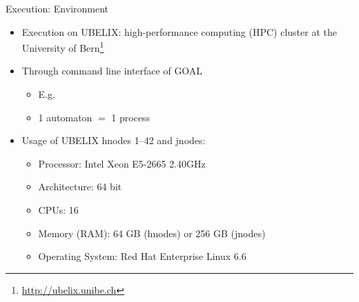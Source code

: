 \documentclass[12pt]{beamer}
\begin{document}
\begin{frame}{Execution: Environment}
\vspace{3mm}
\begin{itemize}\itemsep9pt
\item Execution on UBELIX: high-performance computing (HPC) cluster at the University of Bern\footnote{\url{http://ubelix.unibe.ch}}
\pause
\item Through command line interface of GOAL
  \begin{itemize}\itemsep1pt
  \item E.g. \texttt{\color{blue}{gc complement -m fribourg 00001.gff}}
  \item 1 automaton $=$ 1 process
  \end{itemize}
\pause
\item Usage of UBELIX hnodes 1--42 and jnodes:
  \begin{itemize}\itemsep1pt
  \item Processor:        \tabto{3.25cm} Intel Xeon E5-2665 2.40GHz
  \item Architecture:     \tabto{3.25cm} 64 bit
  \item CPUs:             \tabto{3.25cm} 16
  \item Memory (RAM):     \tabto{3.25cm} 64 GB (hnodes) or 256 GB (jnodes)
  \item Operating System: \tabto{3.25cm} Red Hat Enterprise Linux 6.6
  \end{itemize}
\end{itemize}

\end{frame}
\end{document}
